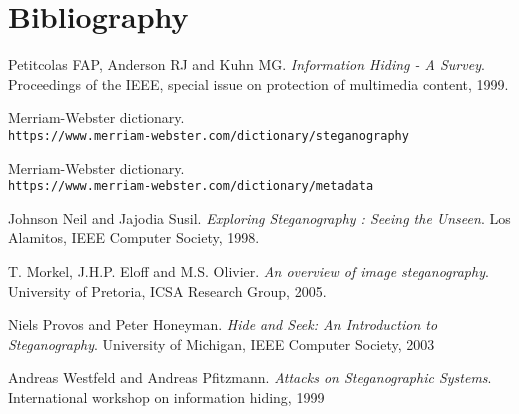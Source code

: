 \documentclass[notitlepage]{report}
\begin{document}
\chapter{Bibliography}
\begin{thebibliography}{9}
Petitcolas FAP, Anderson RJ and Kuhn MG.
\textit{Information Hiding - A Survey}.
Proceedings of the IEEE, special issue on protection of multimedia content, 1999.


Merriam-Webster dictionary.
\\\texttt{https://www.merriam-webster.com/dictionary/steganography}

Merriam-Webster dictionary.
\\\texttt{https://www.merriam-webster.com/dictionary/metadata}


Johnson Neil and Jajodia Susil.
\textit{Exploring Steganography : Seeing the Unseen}. 
Los Alamitos, IEEE Computer Society, 1998.

%
T. Morkel, J.H.P. Eloff and M.S. Olivier. 
\textit{An overview of image steganography}.
University of Pretoria, ICSA Research Group, 2005.

Niels Provos and Peter Honeyman.
\textit{Hide and Seek: An Introduction to Steganography}.
University of Michigan, IEEE Computer Society, 2003

Andreas Westfeld and Andreas Pfitzmann.
\textit{Attacks on Steganographic Systems}.
International workshop on information hiding, 1999
\end{thebibliography}
\end{document}
